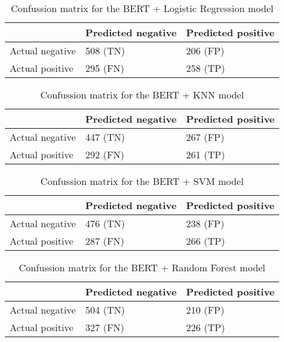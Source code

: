 
\begin{table}[!htbp]
\centering
{
\makegapedcells
\begin{tabular}{lll}
                & Predicted negative & Predicted positive \\
\hline
Actual negative & 508 (TN)           & 206 (FP) \\
Actual positive & 295 (FN)           & 258 (TP) \\
\hline
\end{tabular}
}
\caption{Confussion matrix for the BERT + Logistic Regression model}
\label{bertlr_cm}
\end{table}

\begin{table}[!htbp]
\centering
{
\makegapedcells
\begin{tabular}{lll}
                & Predicted negative & Predicted positive \\
\hline
Actual negative & 447 (TN)           & 267 (FP) \\
Actual positive & 292 (FN)           & 261 (TP) \\
\hline
\end{tabular}
}
\caption{Confussion matrix for the BERT + KNN model}
\label{bertknn_cm}
\end{table}

\begin{table}[!htbp]
\centering
{
\makegapedcells
\begin{tabular}{lll}
                & Predicted negative & Predicted positive \\
\hline
Actual negative & 476 (TN)           & 238 (FP) \\
Actual positive & 287 (FN)           & 266 (TP) \\
\hline
\end{tabular}
}
\caption{Confussion matrix for the BERT + SVM model}
\label{bertsvm_cm}
\end{table}

\begin{table}[!htbp]
\centering
{
\makegapedcells
\begin{tabular}{lll}
                & Predicted negative & Predicted positive \\
\hline
Actual negative & 504 (TN)           & 210 (FP) \\
Actual positive & 327 (FN)           & 226 (TP) \\
\hline
\end{tabular}
}
\caption{Confussion matrix for the BERT + Random Forest model}
\label{bertrf_cm}
\end{table}

